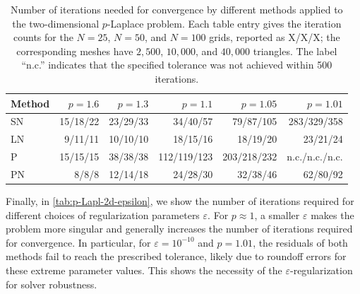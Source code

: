 \documentclass[11pt,pdflatex,sn-mathphys-num]{sn-jnl}
\theoremstyle{thmstyleone}%
\theoremstyle{thmstyletwo}%
\theoremstyle{thmstylethree}%
\begin{document}
\begin{table}[t]
    \centering
    \caption{Number of iterations needed for convergence by different methods applied to the two-dimensional $p$-Laplace problem. Each table entry gives the iteration counts for the $N=25$, $N=50$, and $N=100$ grids, reported as X/X/X; the corresponding meshes have $2{,}500$, $10{,}000$, and $40{,}000$ triangles. The label ``n.c.'' indicates that the specified tolerance was not achieved within 500 iterations.}  \label{tab:p-Lapl-2d}
    \begin{tabular}{lrrrrr}
        \toprule
        Method & $p=1.6$ & $p=1.3$ & $p=1.1$ & $p=1.05$ & $p=1.01$ \\
        \midrule
        SN & 15/18/22 & 23/29/33 & 34/40/57 & 79/87/105 & 283/329/358 \\
        LN & 9/11/11 & 10/10/10 & 18/15/16 & 18/19/20 & 23/21/24 \\
        P & 15/15/15 & 38/38/38 & 112/119/123 & 203/218/232 & n.c./n.c./n.c. \\
        PN & 8/8/8 & 12/14/18 & 24/28/30 & 32/38/46 & 62/80/92 \\
        \bottomrule
    \end{tabular}
\end{table}

Finally, in \cref{tab:p-Lapl-2d-epsilon}, we show the number of iterations required for different choices of regularization parameters $\varepsilon$. For $p\approx 1$, a smaller $\varepsilon$ makes the problem more singular and generally increases the number of iterations required for convergence. In particular, for $\varepsilon=10^{-10}$ and $p=1.01$, the residuals of both methods fail to reach the prescribed tolerance, likely due to roundoff errors for these extreme parameter values. This shows the necessity of  the $\varepsilon$-regularization for solver robustness.
\end{document}
